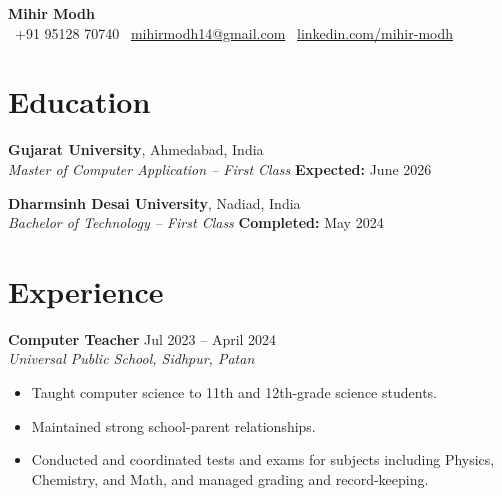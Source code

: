 \documentclass[11pt,a4paper]{article}
\begin{document}
\begin{center}
  {\Huge \textbf{Mihir Modh}}\\[8pt]
  \faPhone \ +91 95128 70740 \quad
  \faEnvelope \ \href{mailto:thakkarsumit1112@gmail.com}{mihirmodh14@gmail.com} \quad
  \faLinkedinSquare \ \href{https://linkedin.com/sumitthakkar}{linkedin.com/mihir-modh}
\end{center}

\vspace{0.5cm}

\section*{Education}

\textbf{Gujarat University}, Ahmedabad, India \\
\textit{Master of Computer Application – First Class} \hfill \textbf{Expected:} June 2026

\vspace{0.2cm}

\textbf{Dharmsinh Desai University}, Nadiad, India \\
\textit{Bachelor of Technology – First Class} \hfill \textbf{Completed:} May 2024

\section*{Experience}

\textbf{Computer Teacher} \hfill Jul 2023 – April 2024 \\
\textit{Universal Public School, Sidhpur, Patan} 
\begin{itemize}
  \item Taught computer science to 11th and 12th-grade science students.
  \item Maintained strong school-parent relationships.
  \item Conducted and coordinated tests and exams for subjects including Physics, Chemistry, and Math, and managed grading and record-keeping.
\end{itemize}



\end{document}
